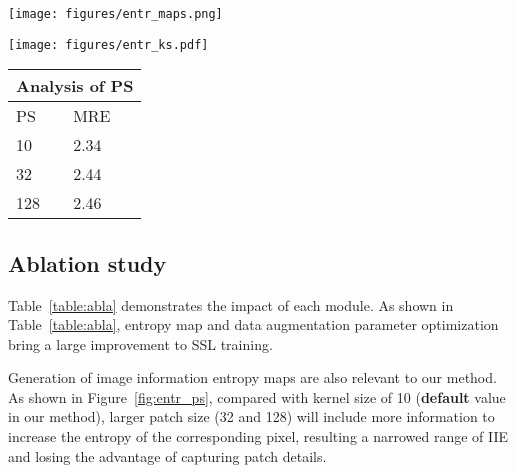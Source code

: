 \documentclass[10pt,twocolumn,letterpaper]{article}
\begin{document}
\begin{figure*}[]
\begin{minipage}{0.36\linewidth}
 \centering
 \texttt{[image: figures/entr\_maps.png]}
\end{minipage}
%
\begin{minipage}{0.43\linewidth}
 \centering
 \texttt{[image: figures/entr\_ks.pdf]}
\end{minipage}
%
\begin{minipage}{0.2\linewidth}
    \centering
    \begin{tabular}{l|l}
    \multicolumn{2}{c}{Analysis of PS} \\
    \hline
        PS  & MRE  \\
        \hline
        10 & 2.34   \\
        \hline
        32 & 2.44 \\
        \hline 
        128 & 2.46 \\
    \hline
    \end{tabular}
\end{minipage}
\caption{Left: The IIE maps generated by different sizes of image patches; Middle: The IIE distribution of pixels using different sizes of patches; and Right: Results with entropy maps of different patch sizes (PS).}
\label{fig:entr_ps}
\end{figure*}




\subsection{Ablation study}
Table~\ref{table:abla} demonstrates the impact of each module. 
As shown in Table~\ref{table:abla}, entropy map and data augmentation parameter optimization bring a large improvement to SSL training. 

Generation of image information entropy maps are also relevant to our method. As shown in Figure~\ref{fig:entr_ps}, compared with kernel size of 10 ({\bf default} value in our method), larger patch size (32 and 128) will include more information to increase the entropy of the corresponding pixel, resulting a narrowed range of IIE and losing the advantage of capturing patch details. 
\end{document}
